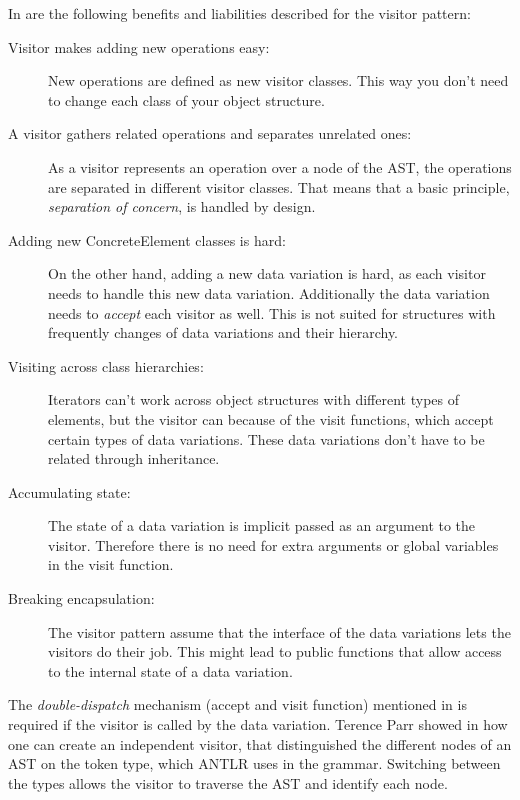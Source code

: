 \documentclass{llncs}
\begin{document}
In \cite{GHJV94} are the following benefits and liabilities described for the visitor pattern:

\begin{description}
	\item[Visitor makes adding new operations easy:] New operations are defined as new visitor classes. This way you don't need to change each class of your object structure.
	
	\item[A visitor gathers related operations and separates unrelated ones:] As a visitor represents an operation over a node of the AST, the operations are separated in different visitor classes. That means that a basic principle, \emph{separation of concern}, is handled by design.
	
	\item[Adding new ConcreteElement classes is hard:] On the other hand, adding a new data variation is hard, as each visitor needs to handle this new data variation. Additionally the data variation needs to \emph{accept} each visitor as well. This is not suited for structures with frequently changes of data variations and their hierarchy.
	
	\item[Visiting across class hierarchies:] Iterators can't work across object structures with different types of elements, but the visitor can because of the visit functions, which accept certain types of data variations. These data variations don't have to be related through inheritance.
	
	\item[Accumulating state:] The state of a data variation is implicit passed as an argument to the visitor. Therefore there is no need for extra arguments or global variables in the visit function.
	
	\item[Breaking encapsulation:] The visitor pattern assume that the interface of the data variations lets the visitors do their job. This might lead to public functions that allow access to the internal state of a data variation.
\end{description}

The \emph{double-dispatch} mechanism (accept and visit function) mentioned in \cite{GHJV94} is required if the visitor is called by the data variation. Terence Parr showed in \cite{Parr09} how one can create an independent visitor, that distinguished the different nodes of an AST on the token type, which ANTLR uses in the grammar. Switching between the types allows the visitor to traverse the AST and identify each node.
\end{document}
